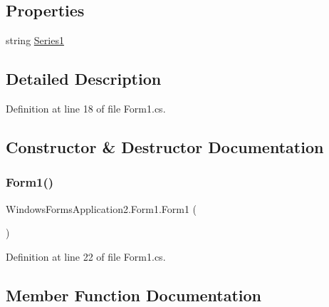 \subsection*{Properties}
\begin{DoxyCompactItemize}
\item 
string \hyperlink{class_windows_forms_application2_1_1_form1_a8591054f8f980fd29da1f3ad39cff10a}{Series1}
\end{DoxyCompactItemize}


\subsection{Detailed Description}


Definition at line 18 of file Form1.\+cs.



\subsection{Constructor \& Destructor Documentation}
\hypertarget{class_windows_forms_application2_1_1_form1_a33adff6125395f3e1c655152b0225a1c}{}\label{class_windows_forms_application2_1_1_form1_a33adff6125395f3e1c655152b0225a1c} 
\subsubsection{\texorpdfstring{Form1()}{Form1()}}
{\footnotesize\ttfamily Windows\+Forms\+Application2.\+Form1.\+Form1 (\begin{DoxyParamCaption}{ }\end{DoxyParamCaption})}



Definition at line 22 of file Form1.\+cs.



\subsection{Member Function Documentation}
\hypertarget{class_windows_forms_application2_1_1_form1_aad16a744e3df3421fa1612f17958440d}{}\label{class_windows_forms_application2_1_1_form1_aad16a744e3df3421fa1612f17958440d} 

